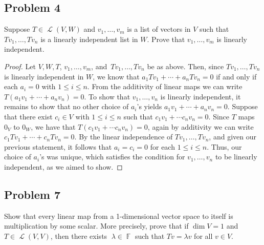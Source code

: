 \documentclass[letterpaper, 12pt]{amsart}
\DeclareMathOperator{\F}{\mathbb{F}}
\DeclareMathOperator{\Ell}{\mathscr{L}}
\theoremstyle{definition}  %
\begin{document}
		\subsection*{Problem 4}
		Suppose $T \in \Ell(V,W)$ and $v_{1}, \dots, v_{m}$ is a list of vectors in $V$ such that $Tv_{1}, \dots, Tv_{n}$ is a linearly independent list in $W$.
		Prove that $v_{1}, \dots, v_{m}$ is linearly independent.

		\begin{proof}
		Let $V,W,T$, $v_{1}, \dots, v_{m}$, and $\, Tv_{1}, \dots, Tv_{n}$ be as above.
		Then, since $Tv_{1}, \dots, Tv_{n}$ is linearly independent in $W$, we know that $a_{1}Tv_{1} + \cdots + a_{n}Tv_{n} = 0$ if and only if each $a_{i} = 0$ with $1 \leq i \leq n$.
		From the additivity of linear maps we can write $T(a_{1}v_{1} + \cdots + a_{n}v_{n}) = 0$.
		To show that $v_{1}, \dots, v_{n}$ is linearly independent, it remains to show that no other choice of $a_{i}$'s yields $a_{1}v_{1} + \cdots + a_{n}v_{n} = 0$.
		Suppose that there exist $c_{i} \in V$ with $1 \leq i \leq n$ such that $c_{1}v_{1} + \cdots c_{n}v_{n} = 0$.
		Since $T$ maps $0_{V}$ to $0_{W}$, we have that $T(c_{1}v_{1} + \cdots c_{n}v_{n}) = 0$, again by additivity we can write $c_{1}Tv_{1} + \cdots + c_{n}Tv_{n} = 0$.
		By the linear independence of $Tv_{1}, \dots, Tv_{n}$, and given our previous statement, it follows that $a_{i} = c_{i} = 0$ for each $1 \leq i \leq n$.
		Thus, our choice of $a_{i}$'s was unique, which satisfies the condition for $v_{1}, \dots, v_{n}$ to be linearly independent, as we aimed to show.
		\end{proof}

		\subsection*{Problem 7}
		Show that every linear map from a 1-dimensional vector space to itself is multiplication by some scalar. 
		More precisely, prove that if $\dim V = 1$ and $T \in \Ell(V,V)$, then there exists 􏰀$\lambda \in \F$ such that $Tv = \lambda v$ for all $v \in V$.
\end{document}
